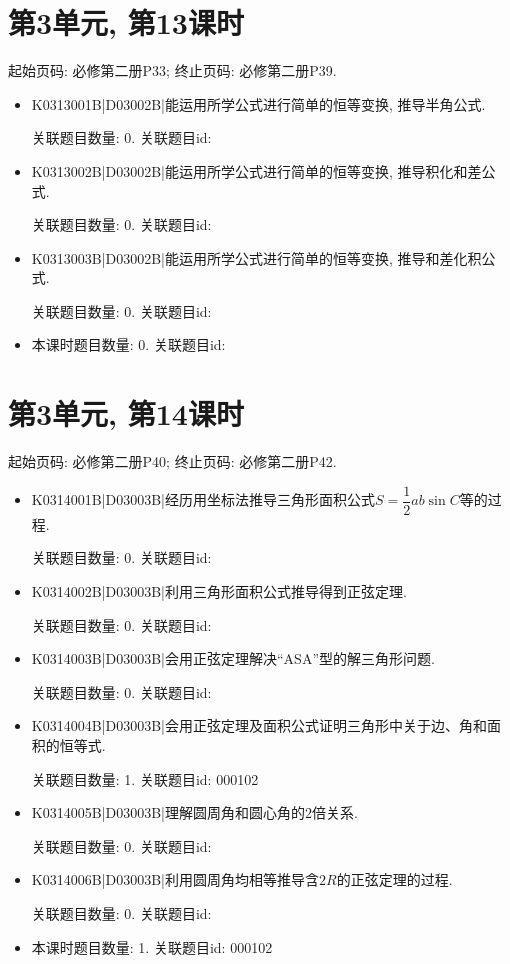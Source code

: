 \section*{第3单元, 第13课时}
起始页码: 必修第二册P33; 终止页码: 必修第二册P39.
\begin{itemize}
\item K0313001B|D03002B|能运用所学公式进行简单的恒等变换, 推导半角公式.

关联题目数量: 0. 关联题目id: 

\item K0313002B|D03002B|能运用所学公式进行简单的恒等变换, 推导积化和差公式.

关联题目数量: 0. 关联题目id: 

\item K0313003B|D03002B|能运用所学公式进行简单的恒等变换, 推导和差化积公式.

关联题目数量: 0. 关联题目id: 

\item 本课时题目数量: 0. 关联题目id: 

\end{itemize}

\section*{第3单元, 第14课时}
起始页码: 必修第二册P40; 终止页码: 必修第二册P42.
\begin{itemize}
\item K0314001B|D03003B|经历用坐标法推导三角形面积公式$S=\dfrac{1}{2}ab\sin C$等的过程.

关联题目数量: 0. 关联题目id: 

\item K0314002B|D03003B|利用三角形面积公式推导得到正弦定理.

关联题目数量: 0. 关联题目id: 

\item K0314003B|D03003B|会用正弦定理解决``ASA''型的解三角形问题.

关联题目数量: 0. 关联题目id: 

\item K0314004B|D03003B|会用正弦定理及面积公式证明三角形中关于边、角和面积的恒等式.

关联题目数量: 1. 关联题目id: 000102

\item K0314005B|D03003B|理解圆周角和圆心角的$2$倍关系.

关联题目数量: 0. 关联题目id: 

\item K0314006B|D03003B|利用圆周角均相等推导含$2R$的正弦定理的过程.

关联题目数量: 0. 关联题目id: 

\item 本课时题目数量: 1. 关联题目id: 000102

\end{itemize}

